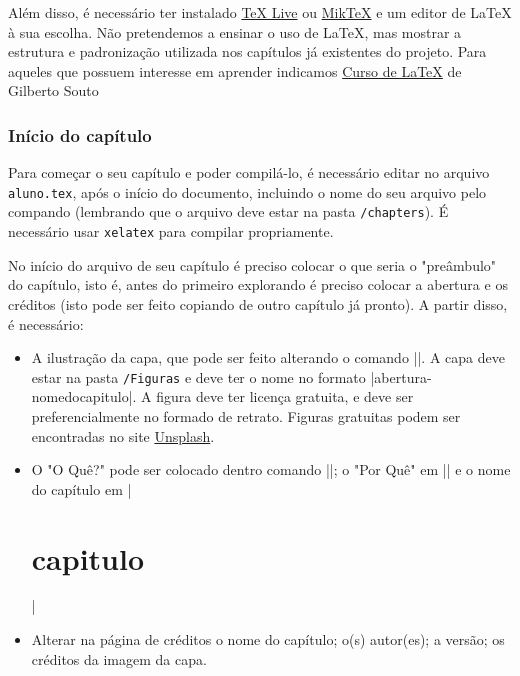 Além disso, é necessário ter instalado \href{https://www.tug.org/texlive/}{\TeX{} Live} ou \href{https://miktex.org/}{Mik\TeX}{} e um editor de \LaTeX{} à sua escolha. Não pretendemos a ensinar o uso de \LaTeX, mas mostrar a estrutura e padronização utilizada nos capítulos já existentes do projeto. Para aqueles que possuem interesse em aprender indicamos \href{http://www.uft.edu.br/engambiental/prof/catalunha/arquivos/latex/latex_GilbertoSouto.pdf}{Curso de \LaTeX{}} de Gilberto Souto %


\subsection{Início do capítulo}

Para começar o seu capítulo e poder compilá-lo, é necessário editar no arquivo \verb|aluno.tex|, após o início do documento, incluindo o nome do seu arquivo pelo compando \verb||(lembrando que o arquivo deve estar na pasta \verb|/chapters|). É necessário usar \verb|xelatex| para compilar propriamente.

No início do arquivo de seu capítulo é preciso colocar o que seria o "preâmbulo"{} do capítulo, isto é, antes do primeiro explorando é preciso colocar a abertura e os créditos (isto pode ser feito copiando de outro capítulo já pronto). A partir disso, é necessário:

\begin{itemize}
\item A ilustração da capa, que pode ser feito alterando o comando \spverb|\renewcommand\chapterillustration{./abertura-capitulo}|. A capa deve estar na pasta \verb|/Figuras| e deve ter o nome no formato \spverb|abertura-nomedocapitulo|. A figura deve ter licença gratuita, e deve ser preferencialmente no formado de retrato. Figuras gratuitas podem ser encontradas no site \href{https://unsplash.com/}{Unsplash}.

\item O "O Quê?"{} pode ser colocado dentro comando \spverb|\renewcommand\chapterwhat{o que}|; o "Por Quê"{} em \spverb|\renewcommand\chapterbecause{por que}| e o nome do capítulo em \spverb|\chapter{capitulo}|

\item Alterar na página de créditos o nome do capítulo; o(s) autor(es); a versão; os créditos da imagem da capa.
\end{itemize}

